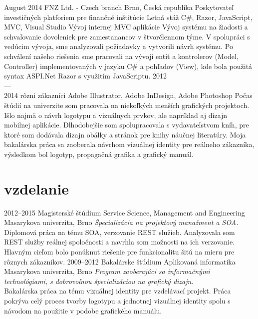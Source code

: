 \documentclass[]{friggeri-cv} %
\begin{document}
\begin{entrylist}
\job
{August 2014}
{FNZ Ltd. - Czech branch}
{Brno, Česká republika}
{Poskytovateľ investičných platforiem pre finančné inštitúcie}
{
\position
{Letná stáž}
{C\#, Razor, JavaScript, MVC, Visual Studio}
{Vývoj internej MVC aplikácie
Vývoj systému na žiadosti a schvaľovanie dovoleniek pre zamestanancov v štvorčlennom týme. V spolupráci s vedúcim vývoja, sme analyzovali požiadavky a vytvorili návrh systému. Po schválení našeho riešenia sme pracovali na vývoji entít a kontrolerov (Model, Controller) implementovaných v jazyku C\# a pohľadov (View), kde bola použitá syntax ASPI.Net Razor s využitím JavaScriptu.}
}
\job
{2012 \\ --- \\ 2014}
{rôzni zákazníci}
{}
{}
{
  {Adobe Illustrator, Adobe InDesign, Adobe Photoshop}
  {Počas štúdií na univerzite som pracovala na niekoľkých menších grafických projektoch. Išlo najmä o návrh logotypu a vizuálnych prvkov, ale napríklad aj dizajn mobilnej aplikácie. Dlhodobejšie som spolupracovala s vydavateľstvom kníh, pre ktoré som dodávala dizajn obálky a stránok pre knihy náučnej literatúry. Moja bakalárska práca sa zaoberala návrhom vizuálnej identity pre reálneho zákazníka, výsledkom bol logotyp, propagačná grafika a grafický manuál.}
}
\end{entrylist}



\section{vzdelanie}

\begin{entrylist}
\entry
{2012--2015}
{Magisterské štúdium {\normalfont Service Science, Management and Engineering}}
{Masarykova univerzita, Brno}
{\emph{Špecializácia na projektový manažment a SOA.} \\ Diplomová práca na tému SOA, verzovanie REST služieb. Analyzovala som REST služby reálnej spoločnosti a navrhla som možnosti na ich verzovanie. Hlavným cieľom bolo ponúknuť riešenie pre funkcionalitu šitú na mieru pre rôznych zákazníkov.}
\entry
{2009--2012}
{Bakalárske štúdium {\normalfont Aplikovaná informatika}}
{Masarykova univerzita, Brno}
{\emph{Program zaoberajúci sa informačnými technológiami, s dobrovoľnou špecializáciou na grafický dizajn.} \\ Bakalárska práca na tému vizuálnej identity pre vzdelávací projekt. Práca pokrýva celý proces tvorby logotypu a jednotnej vizuálnej identity spolu s návodom na použitie v podobe grafického manuálu.}
\end{entrylist}
\end{document}
